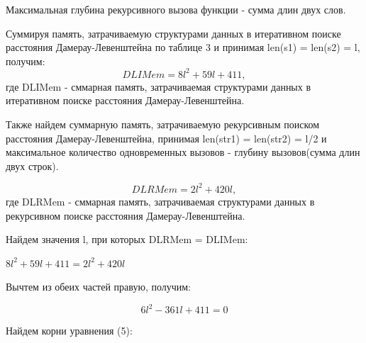 \documentclass[a4paper, 14pt]{article}
\begin{document}
		\begin{center}
	
	Максимальная глубина рекурсивного вызова функции - сумма длин двух слов. \\
	\end{center}
	 \begin{flushleft}
  Суммируя память, затрачиваемую структурами данных в итеративном поиске расстояния Дамерау-Левенштейна по таблице 3 и принимая len(s1) = len(s2) = l, получим:\\
  		\begin{equation}
			DLIMem = 8l^2 + 59l + 411,
		\end{equation}
		где DLIMem - сммарная память, затрачиваемая структурами данных в итеративном поиске расстояния Дамерау-Левенштейна.\\
		\begin{flushleft}
Также найдем суммарную память, затрачиваемую рекурсивным поиском расстояния Дамерау-Левенштейна, принимая len(str1) = len(str2) = l/2 и максимальное количество одновременных вызовов - глубину вызовов(сумма длин двух строк).
		\end{flushleft}
		\begin{equation}
			DLRMem = 2l^2 + 420l,
		\end{equation}
		где DLRMem - сммарная память, затрачиваемая структурами данных в рекурсивном поиске расстояния Дамерау-Левенштейна.\\
	\begin{flushleft}
		Найдем значения l, при которых DLRMem = DLIMem:\\
		\end{flushleft}	

		\begin{center}
				
		$8l^2 + 59l + 411 = 2l^2 + 420l$\\
		\begin{flushleft}
		Вычтем из обеих частей правую, получим:	
		\end{flushleft}
		
		\begin{equation}		
		6l^2  - 361l + 411 = 0
		\end{equation}
		\begin{flushleft}
		Найдем корни уравнения (5):\\
		\end{flushleft}
		

\end{center}
\end{flushleft}
\end{document}

